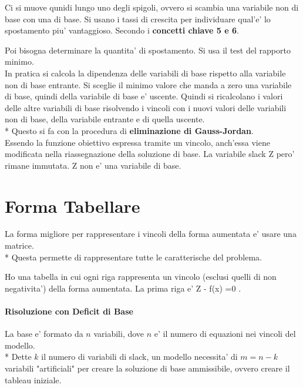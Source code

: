 Ci si muove qunidi lungo uno degli spigoli, ovvero si scambia una variabile non di base con una di base.
Si usano i tassi di crescita per individuare qual'e' lo spostamento piu' vantaggioso. Secondo i \textbf{concetti chiave 5 e 6}.

Poi bisogna determinare la quantita' di spostamento. Si usa il test del rapporto minimo. \\
In pratica si calcola la dipendenza delle variabili di base rispetto alla variabile non di base entrante.
Si sceglie il minimo valore che manda a zero una variabile di base, quindi della variabile di base e' uscente.
Quindi si ricalcolano i valori delle altre variabili di base risolvendo i vincoli con i nuovi valori delle variabili non di base, della variabile entrante e di quella uscente. \\*
Questo si fa con la procedura di \textbf{eliminazione di Gauss-Jordan}. \\

Essendo la funzione obiettivo espressa tramite un vincolo, anch'essa viene modificata nella riassegnazione della soluzione di base. La variabile slack Z pero' rimane immutata. Z non e' una variabile di base. \\

\section{Forma Tabellare}

La forma migliore per rappresentare i vincoli della forma aumentata e' usare una matrice. \\*
Questa permette di rappresentare tutte le caratterische del problema.

Ho una tabella in cui ogni riga rappresenta un vincolo (esclusi quelli di non negativita') della forma aumentata. La prima riga e' Z  - f(x) =0 .

\paragraph{Risoluzione con Deficit di Base}

La base e' formato da $n$ variabili, dove $n$ e' il numero di equazioni nei vincoli del modello. \\*
Dette $k$ il numero di variabili di slack, un modello necessita' di $m = n - k$ variabili "artificiali" per creare la soluzione di base ammissibile, ovvero creare il tableau iniziale. \\

